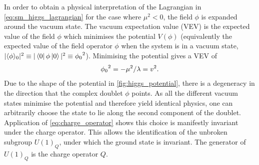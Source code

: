 %
In order to obtain a physical interpretation of the Lagrangian in \cref{eq:sm_higgs_lagrangian} for the case where $\mu^2 < 0$, the field $\phi$ is expanded around the vacuum state.
The vacuum expectation value (VEV) is the expected value of the field $\phi$ which minimises the potential $V(\phi)$ (equivalently the expected value of the field operator $\phi$ when the system is in a vacuum state, $|\langle{\phi}\rangle_0|^2 \equiv |\left\langle 0 \right| \phi \left| 0 \right\rangle|^2 \equiv {\phi_0}^2$).
Minimising the potential gives a VEV of
%
\begin{equation}\label{eq:higgs_vev}
  {\phi_0}^2 = -\mu^2 / \lambda = v^2 .
\end{equation}
%
Due to the shape of the potential in \cref{fig:higgs_potential}, there is a degeneracy in the direction that the complex doublet $\phi$ points.
As all the different vacuum states minimise the potential and therefore yield identical physics, one can arbitrarily choose the state to lie along the second component of the doublet.
Application of \cref{eq:charge_operator} shows this choice is manifestly invariant under the charge operator.
This allows the identification of the unbroken subgroup $U(1)_Q$, under which the ground state is invariant.
The generator of $U(1)_Q$ is the charge operator $Q$.





